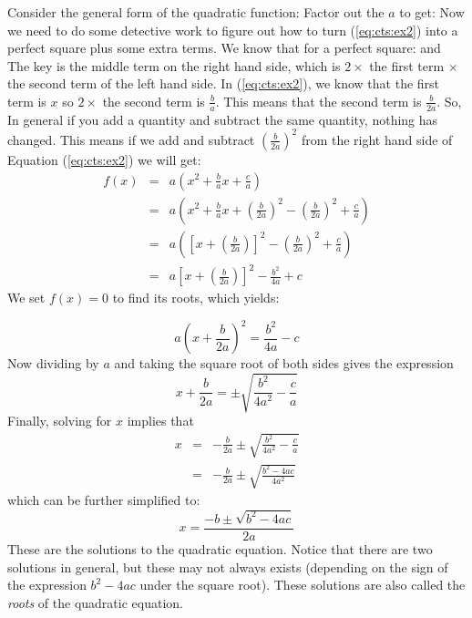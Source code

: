 Consider the general form of the quadratic function:
Factor out the $a$ to get:
Now we need to do some detective work to figure out how to turn (\ref{eq:cts:ex2}) into a perfect square plus some extra terms. We know that for a perfect square:
and
The key is the middle term on the right hand side, which is $2\times$ the first term $\times$ the second term of the left hand side.
In (\ref{eq:cts:ex2}), we know that the first term is $x$ so $2\times$ the second term is $\frac{b}{a}$. This means that the second term is $\frac{b}{2a}$. So,
In general if you add a quantity and subtract the same quantity, nothing has changed. This means if we add and subtract $\left(\frac{b}{2a}\right)^2$ from the right hand side of Equation (\ref{eq:cts:ex2}) we will get:
\begin{eqnarray}
f(x)&=&a\left(x^2+\frac{b}{a}x+\frac{c}{a}\right)\\
&=&a\left(x^2+\frac{b}{a}x+\left(\frac{b}{2a}\right)^2 - \left(\frac{b}{2a}\right)^2+\frac{c}{a}\right)\\
&=&a\left(\left[x+\left(\frac{b}{2a}\right)\right]^2 - \left(\frac{b}{2a}\right)^2+\frac{c}{a}\right)\\
&=&a\left[x+\left(\frac{b}{2a}\right)\right]^2 - \frac{b^2}{4a} +c
\end{eqnarray}
We set $f(x)=0$ to find its roots, which yields:

\begin{equation}
a\left(x + \frac{b}{2a}\right)^{2} = \frac{b^{2}}{4a} - c
\end{equation}
Now dividing by $a$ and taking the square root of both sides gives the
expression
\begin{equation}
x + \frac{b}{2a} = \pm\sqrt{\frac{b^{2}}{4a^{2}} - \frac{c}{a}}
\end{equation}
Finally, solving for $x$ implies that
\begin{eqnarray*}
x& =& -\frac{b}{2a} \pm\sqrt{\frac{b^{2}}{4a^{2}} - \frac{c}{a}}\\
&=& -\frac{b}{2a} \pm \sqrt{\frac{b^{2} - 4ac}{4a^{2}}}
\end{eqnarray*}
which can be further simplified to:
\begin{equation}
x = \frac{-b \pm \sqrt{b^{2} - 4ac}}{2a}
\label{eq:qform}
\end{equation}
These are the solutions to the quadratic equation. Notice that there are two
solutions in general, but these may not always exists (depending on the sign of
the expression $b^{2} - 4ac$ under the square root). These solutions are also
called the \textit{roots} of the quadratic equation.

